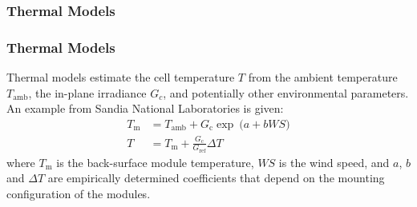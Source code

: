 \begin{frame}
\frametitle{Thermal Models}
    \frametitle{Thermal Models}
    Thermal models estimate the cell temperature \(T\) from the ambient temperature \(T_{\text{amb}}\),
    the in-plane irradiance \(G_c\), and potentially other environmental parameters.
    An example from Sandia National Laboratories is given:
    \vspace*{0.5cm}
    \begin{align}
        T_{\text{m}} &= T_{\text{amb}} + G_{\text{c}} \exp \: \bigl(a + b \mathit{WS} \bigr) \\
        T &= T_{\text{m}} + \frac{G_{\text{c}}}{G_{\text{ref}}} \Delta T
    \end{align}
    where \(T_{\text{m}}\) is the back-surface module temperature, \(WS\) is the wind speed,
    and \(a\), \(b\) and \(\Delta T\) are empirically determined coefficients that depend on
    the mounting configuration of the modules.
\end{frame}

